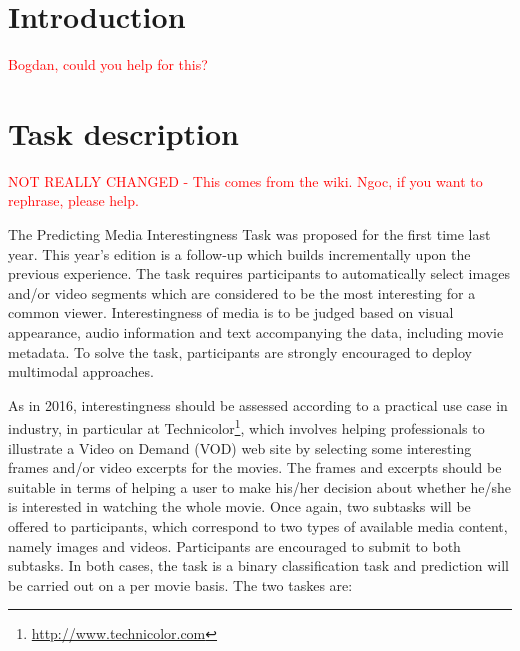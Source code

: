 \documentclass[sigconf]{acmart-me}
\begin{document}
\maketitle


\section{Introduction}

\textcolor{red}{Bogdan, could you help for this?}

\section{Task description}
\textcolor{red}{NOT REALLY CHANGED - This comes from the wiki. Ngoc, if you want to rephrase, please help.}

The Predicting Media Interestingness Task was proposed for the first time last year. This year's edition is a follow-up which builds incrementally upon the previous experience. The task requires participants to automatically select images and/or video segments which are considered to be the most interesting for a common viewer. Interestingness of media is to be judged based on visual appearance, audio information and text accompanying the data, including movie metadata. To solve the task, participants are strongly encouraged to deploy multimodal approaches.

As in 2016, interestingness should be assessed according to a practical use case in industry, in particular at Technicolor\footnote{\url{http://www.technicolor.com}}, which involves helping professionals to illustrate a Video on Demand (VOD) web site by selecting some interesting frames and/or video excerpts for the movies. The frames and excerpts should be suitable in terms of helping a user to make his/her decision about whether he/she is interested in watching the whole movie.
Once again, two subtasks will be offered to participants, which correspond to two types of available media content, namely images and videos. Participants are encouraged to submit to both subtasks. In both cases, the task is a binary classification task and prediction will be carried out on a per movie basis.
The two taskes are:
\end{document}
